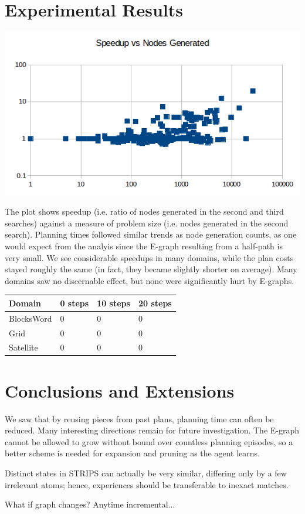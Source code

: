 \documentclass[letterpaper]{article}
\begin{document}
\section{Experimental Results}

\includegraphics[scale=0.4]{AIPlot.png}

The plot shows speedup (i.e. ratio of nodes generated in the second and third searches) against a measure of problem size (i.e. nodes generated in the second search). Planning times followed similar trends as node generation counts, as one would expect from the analyis since the E-graph resulting from a half-path is very small. We see considerable speedups in many domains, while the plan costs stayed roughly the same (in fact, they became slightly shorter on average). Many domains saw no discernable effect, but none were significantly hurt by E-graphs.

\begin{center}
    \begin{tabular}{| l | l | l | l |}
    \hline
    Domain & 0 steps & 10 steps & 20 steps
    \\ \hline
    BlocksWord & 0 & 0 & 0
    \\ \hline
    Grid & 0 & 0 & 0
    \\ \hline
    Satellite & 0 & 0 & 0
    \\ \hline
    \end{tabular}
\end{center}

\section{Conclusions and Extensions}

We saw that by reusing pieces from past plans, planning time can often be reduced. Many interesting directions remain for future investigation. The E-graph cannot be allowed to grow without bound over countless planning episodes, so a better scheme is needed for expansion and pruning as the agent learns.

Distinct states in STRIPS can actually be very similar, differing only by a few irrelevant atoms; hence, experiences should be transferable to inexact matches.

What if graph changes? Anytime incremental...



\end{document}
